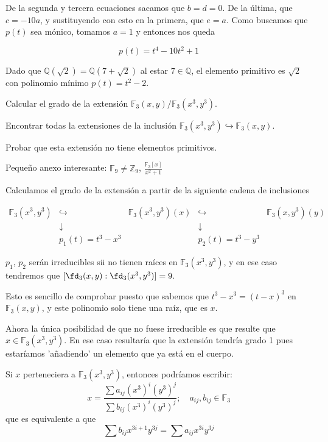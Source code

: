 \begin{problem}[1]
De la segunda y tercera ecuaciones sacamos que $b = d = 0$. De la última, que $c = -10a$, y sustituyendo con esto en la primera, que $e = a$. Como buscamos que $p(t)$ sea mónico, tomamos $a = 1$ y entonces nos queda

\[ p(t) = t^4 - 10t^2 + 1 \]

\spart

Dado que $ℚ(\sqrt{2}) = ℚ(7 + \sqrt{2})$ al estar $7 ∈ ℚ$, el elemento primitivo es $\sqrt{2}$ con polinomio mínimo $p(t) = t^2 - 2$.
\end{problem}

\begin{problem}[3]

\ppart Calcular el grado de la extensión $\mathbb{F}_3(x, y)/\mathbb{F}_3(x^3, y^3)$.

\ppart Encontrar todas la extensiones de la inclusión $\mathbb{F}_3 (x^3 , y^3) \hookrightarrow \mathbb{F}_3(x, y)$.

\ppart Probar que esta extensión no tiene elementos primitivos.

\solution

Pequeño anexo interesante: $\mathbb{F}_9 ≠ ℤ_9$, $\frac{\mathbb{F}_3[x]}{x^2+1}$

\spart Calculamos el grado de la extensión a partir de la siguiente cadena de inclusiones

\[
\begin{array}{ccccc}
\mathbb{F}_3(x^3,y^3) & \hookrightarrow
	& \mathbb{F}_3(x^3,y^3)(x) & \hookrightarrow
	& \mathbb{F}_3(x,y^3)(y) \\
& \downarrow & & \downarrow & \\
& p_1(t) = t^3-x^3 & & p_2(t) = t^3-y^3 &
\end{array}
\]

$p_1$, $p_2$ serán irreducibles sii no tienen raíces en $\mathbb{F}_3(x^3,y^3)$, y en ese caso tendremos que $[\fd_3(x,y): \fd_3(x^3,y^3)] = 9$.

Esto es sencillo de comprobar puesto que sabemos que $t^3-x^3 = (t-x)^3$ en $\mathbb{F}_3(x,y)$, y este polinomio solo tiene una raíz, que es $x$.

Ahora la única posibilidad de que no fuese irreducible es que resulte que $x\in \mathbb{F}_3(x^3,y^3)$. En ese caso resultaría que la extensión tendría grado 1 pues estaríamos 'añadiendo' un elemento que ya está en el cuerpo.

Si $x$ perteneciera a $\mathbb{F}_3(x^3,y^3)$, entonces podríamos escribir:
\[x = \frac{\sum a_{ij}(x^3)^i(y^3)^j}{\sum b_{ij}(x^3)^i(y^3)^j}; \quad a_{ij},b_{ij} ∈ \mathbb{F}_3\] que es equivalente a que
\[ \sum b_{ij} x^{3i+1}y^{3j} = \sum a_{ij} x^{3i}y^{3j}\]


\end{problem}
